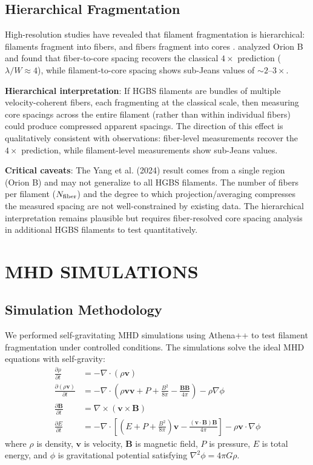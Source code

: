 \documentclass[twoside,twocolumn]{mnras}
\begin{document}
\subsection{Hierarchical Fragmentation}

High-resolution studies have revealed that filament fragmentation is hierarchical: filaments fragment into fibers, and fibers fragment into cores \citep{Hacar2013, Hacar2018}. \citet{Yang2024} analyzed Orion B and found that fiber-to-core spacing recovers the classical $4\times$ prediction ($\lambda/W \approx 4$), while filament-to-core spacing shows sub-Jeans values of $\sim2$--$3\times$.

\textbf{Hierarchical interpretation}: If HGBS filaments are bundles of multiple velocity-coherent fibers, each fragmenting at the classical scale, then measuring core spacings across the entire filament (rather than within individual fibers) could produce compressed apparent spacings. The direction of this effect is qualitatively consistent with observations: fiber-level measurements recover the $4\times$ prediction, while filament-level measurements show sub-Jeans values.

\textbf{Critical caveats}: The Yang et al. (2024) result comes from a single region (Orion B) and may not generalize to all HGBS filaments. The number of fibers per filament ($N_{\rm fiber}$) and the degree to which projection/averaging compresses the measured spacing are not well-constrained by existing data. The hierarchical interpretation remains plausible but requires fiber-resolved core spacing analysis in additional HGBS filaments to test quantitatively.

\section{MHD SIMULATIONS}

\subsection{Simulation Methodology}

We performed self-gravitating MHD simulations using Athena++ \citep{Stone2020} to test filament fragmentation under controlled conditions. The simulations solve the ideal MHD equations with self-gravity:
\begin{align}
\frac{\partial \rho}{\partial t} &= -\nabla \cdot (\rho \mathbf{v}) \\
\frac{\partial (\rho \mathbf{v})}{\partial t} &= -\nabla \cdot \left(\rho \mathbf{v} \mathbf{v} + P + \frac{B^2}{8\pi} - \frac{\mathbf{B}\mathbf{B}}{4\pi}\right) - \rho \nabla \phi \\
\frac{\partial \mathbf{B}}{\partial t} &= \nabla \times (\mathbf{v} \times \mathbf{B}) \\
\frac{\partial E}{\partial t} &= -\nabla \cdot \left[(E + P + \frac{B^2}{8\pi})\mathbf{v} - \frac{(\mathbf{v} \cdot \mathbf{B})\mathbf{B}}{4\pi}\right] - \rho \mathbf{v} \cdot \nabla \phi
\end{align}
where $\rho$ is density, $\mathbf{v}$ is velocity, $\mathbf{B}$ is magnetic field, $P$ is pressure, $E$ is total energy, and $\phi$ is gravitational potential satisfying $\nabla^2 \phi = 4\pi G\rho$.
\end{document}
